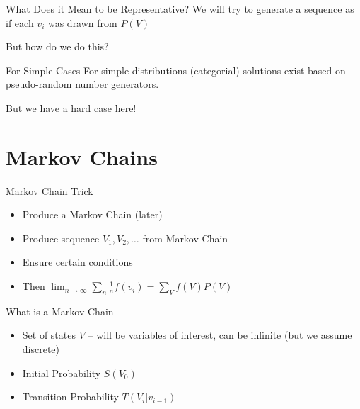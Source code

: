 \documentclass[11pt]{beamer}
\begin{document}
	\begin{frame}{What Does it Mean to be Representative?}
		We will try to generate a sequence as if each $v_i$ was drawn from $P(V)$
		
		\vspace{10pt} But how do we do this?
	\end{frame}
	
	\begin{frame}{For Simple Cases}
		For simple distributions (categorial) solutions exist based on pseudo-random number generators.
		
		\vspace{10pt} But we have a hard case here!
	\end{frame}
	
	\section{Markov Chains}
	
	\begin{frame}{Markov Chain Trick}
		\begin{itemize}
			\item  Produce a Markov Chain (later)
			\item  Produce sequence $V_1,V_2,\dots$ from Markov Chain
			\item Ensure certain conditions
			\item Then $\lim_{n \rightarrow \infty} \sum_{n} \frac{1}{n} f(v_i) = \sum_{V} f(V) P(V)$
		\end{itemize}
	\end{frame}
	
	\begin{frame}{What is a Markov Chain}
		\begin{itemize}
			\item Set of states $V$ -- will be variables of interest, can be infinite (but we assume discrete)
			\item Initial Probability $S(V_0)$
			\item Transition Probability $T(V_i|v_{i-1})$
		\end{itemize}
	\end{frame}
	
\end{document}

